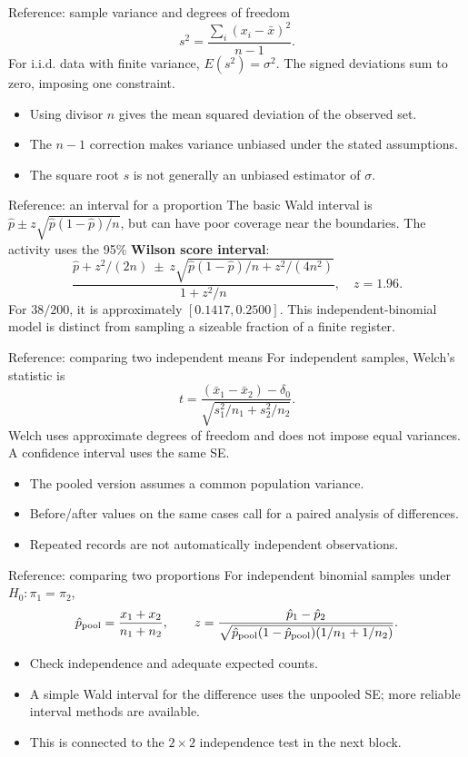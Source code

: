 \begin{frame}{Reference: sample variance and degrees of freedom}
\[
s^2=\frac{\sum_i(x_i-\bar x)^2}{n-1}.
\]
For i.i.d. data with finite variance, $E(s^2)=\sigma^2$. The signed deviations sum to zero, imposing one constraint.
\begin{itemize}\item Using divisor $n$ gives the mean squared deviation of the observed set.\item The $n-1$ correction makes variance unbiased under the stated assumptions.\item The square root $s$ is not generally an unbiased estimator of $\sigma$.\end{itemize}
\end{frame}
\begin{frame}{Reference: an interval for a proportion}
The basic Wald interval is $\hat p\pm z\sqrt{\hat p(1-\hat p)/n}$, but can have poor coverage near the boundaries.
The activity uses the 95\% \textbf{Wilson score interval}:
\[
\frac{\hat p+z^2/(2n)\ \pm\ z\sqrt{\hat p(1-\hat p)/n+z^2/(4n^2)}}{1+z^2/n},\quad z=1.96.
\]
For $38/200$, it is approximately $[0.1417,0.2500]$.
This independent-binomial model is distinct from sampling a sizeable fraction of a finite register.
\end{frame}
\begin{frame}{Reference: comparing two independent means}
For independent samples, Welch's statistic is
\[
t=\frac{(\bar x_1-\bar x_2)-\delta_0}{\sqrt{s_1^2/n_1+s_2^2/n_2}}.
\]
Welch uses approximate degrees of freedom and does not impose equal variances. A confidence interval uses the same SE.
\begin{itemize}\item The pooled version assumes a common population variance.\item Before/after values on the same cases call for a paired analysis of differences.\item Repeated records are not automatically independent observations.\end{itemize}
\end{frame}
\begin{frame}{Reference: comparing two proportions}
For independent binomial samples under $H_0:\pi_1=\pi_2$,
\[
\hat p_{\rm pool}=\frac{x_1+x_2}{n_1+n_2},\qquad
z=\frac{\hat p_1-\hat p_2}{\sqrt{\hat p_{\rm pool}(1-\hat p_{\rm pool})(1/n_1+1/n_2)}}.
\]
\begin{itemize}\item Check independence and adequate expected counts.\item A simple Wald interval for the difference uses the unpooled SE; more reliable interval methods are available.\item This is connected to the $2\times2$ independence test in the next block.\end{itemize}
\end{frame}
